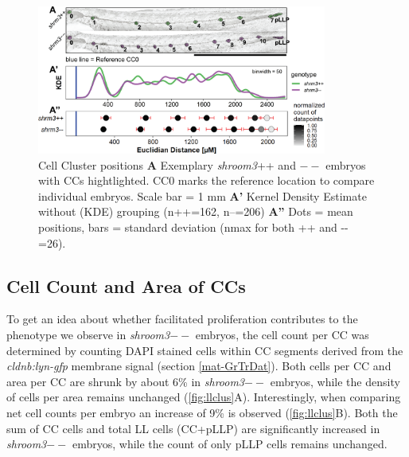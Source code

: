 \documentclass[11pt,singlespacinge,twoside]{reedthesis} %
\begin{document}
\begin{figure}

{\centering \includegraphics[width=0.85\textwidth]{figures/results/01_morphometrics/ll_positions} 

}

\caption[Cell Cluster Positions]{Cell Cluster positions \textbf{A} Exemplary \emph{shroom3}++ and \(--\) embryos with CCs hightlighted. CC0 marks the reference location to compare individual embryos. Scale bar = 1 mm \textbf{A'} Kernel Density Estimate without (KDE) grouping (n++=162, n--=206) \textbf{A''} Dots = mean positions, bars = standard deviation (nmax for both ++ and -\/- =26).}\label{fig:llpos}
\end{figure}
\hypertarget{res-llmorph}{%
\subsection{Cell Count and Area of CCs}\label{res-llmorph}}

To get an idea about whether facilitated proliferation contributes to the phenotype we observe in \emph{shroom3}\(--\) embryos, the cell count per CC was determined by counting DAPI stained cells within CC segments derived from the \emph{cldnb:lyn-gfp} membrane signal (section \ref{mat-GrTrDat}). Both cells per CC and area per CC are shrunk by about 6\% in \emph{shroom3}\(--\) embryos, while the density of cells per area remains unchanged (\ref{fig:llclus}A). Interestingly, when comparing net cell counts per embryo an increase of 9\% is observed (\ref{fig:llclus}B). Both the sum of CC cells and total LL cells (CC+pLLP) are significantly increased in \emph{shroom3}\(--\) embryos, while the count of only pLLP cells remains unchanged.
\end{document}
